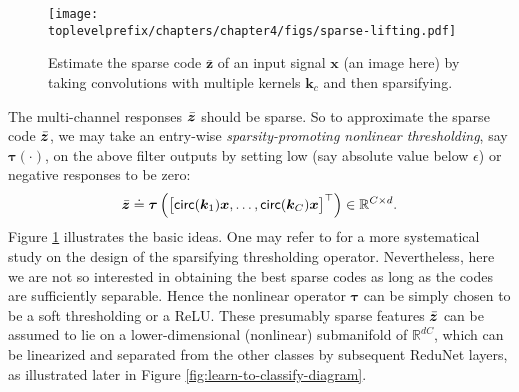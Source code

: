 \documentclass[\toplevelprefix/book-main.tex]{subfiles}
\begin{document}
\begin{figure}[t]
	\centerline{
\texttt{[image: \\toplevelprefix/chapters/chapter4/figs/sparse-lifting.pdf]}}
\caption{Estimate the sparse code $\bar{\bm z}$ of an input signal $\bm x$ (an image here) by taking convolutions with multiple kernels $\bm k_c$ and then sparsifying.}
		\label{fig:multi-channel-sparse-lifting}
\end{figure}
The multi-channel responses $\bar {\bm{z}}$ should be sparse. So to approximate the sparse code $\bar {\bm{z}}$, we may take an entry-wise {\em sparsity-promoting nonlinear thresholding}, say $\bm \tau(\cdot)$, on the above filter outputs by setting low (say absolute value below $\epsilon$) or negative  responses to be zero:
\begin{equation}
\bar {\bm{z}} \doteq \bm \tau \left( \big[\mathsf{circ}(\bm k_1) \bm{x}, \ldots, \mathsf{circ}(\bm k_C) \bm{x} \big]^\top \right) \in \mathbb{R}^{C \times d}.
\label{eqn:sparse-lifting}
\end{equation} 
Figure \ref{fig:multi-channel-sparse-lifting} illustrates the basic ideas. One may refer to \cite{Analysis-Filter} for a more systematical study on the design of the sparsifying thresholding operator. Nevertheless, here we are not so interested in obtaining the best sparse codes as long as the codes are sufficiently separable. Hence the nonlinear operator $\bm \tau$ can be simply chosen to be a soft thresholding or a ReLU. 
These presumably sparse features $\bar {\bm{z}}$ can be assumed to lie on a lower-dimensional (nonlinear) submanifold of $\mathbb{R}^{dC}$, which can be linearized and separated from the other classes by subsequent ReduNet layers, as illustrated later in Figure \ref{fig:learn-to-classify-diagram}. 
\end{document}
